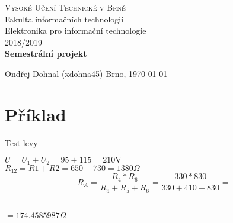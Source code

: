 \documentclass[12pt,a4paper]{article}
\begin{document}
	\begin{titlepage}
		\begin{center}
			\textsc{\LARGE Vysoké Učení Technické v Brně}\\[0.5cm]
			{\LARGE Fakulta informačních technologií }\\[4.0cm]

			\LARGE Elektronika pro informační  technologie\\[0.5cm]
			\textsc{\LARGE 2018/2019}\\[5cm]

			
			\textbf{\LARGE Semestrální projekt}
			\end{center}

			\vfill

			\begin{flushleft} 
				\large
				Ondřej Dohnal (xdohna45)
				\hfill
				Brno, \today
			\end{flushleft}
	\end{titlepage}
\section{Příklad}
\begin{multicols}{2}
\begin{flushleft}
Test levy
\end{flushleft}
\columnbreak
$U=U_1+U_2=95+115=210\mathrm{V}$\\[0.5cm]
$R_{12}=R1+R2=650+730=1380\Omega$
$$R_A=\frac{R_4*R_6}{R_4+R_5+R_6}=\frac{330*830}{330+410+830}=$$\\[-1cm]
\begin{center}
$=174.4585987\Omega$
\end{center}
\end{multicols}
	
\end{document}
